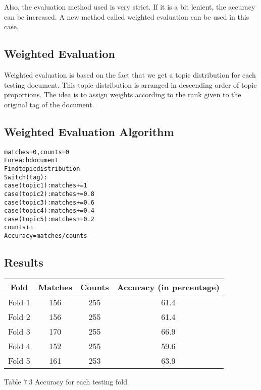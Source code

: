 \par
Also, the evaluation method used is very strict. If it is a bit lenient, the accuracy can be increased. A new method
called weighted evaluation can be used in this case.

\subsection*{Weighted Evaluation}

Weighted evaluation is based on the fact that we get a topic distribution for each testing document. This topic distribution is arranged
in descending order of topic proportions. The idea is to assign weights according to the rank given to the original tag of the document. 

\subsection*{Weighted Evaluation Algorithm}

\begin{alltt}
matches=0, counts=0
For each document
  Find topic distribution
  Switch(tag):
    case(topic1): matches += 1
    case(topic2): matches += 0.8
    case(topic3): matches += 0.6
    case(topic4): matches += 0.4
    case(topic5): matches += 0.2
    counts++
Accuracy = matches/counts
\end{alltt}

\subsection*{Results}

\begin{center}
\begin{tabular}{ |c|c|c|c| }
  \hline
  Fold & Matches & Counts & Accuracy (in percentage) \\ \hline
  Fold 1 & 156 & 255 & 61.4 \\ \hline
  Fold 2 & 156 & 255 & 61.4 \\ \hline
  Fold 3 & 170 & 255 & 66.9 \\ \hline
  Fold 4 & 152 & 255 & 59.6 \\ \hline
  Fold 5 & 161 & 253 & 63.9 \\ \hline
\end{tabular}
\end{center}
\begin{center}
 Table 7.3 Accuracy for each testing fold 
\end{center}

